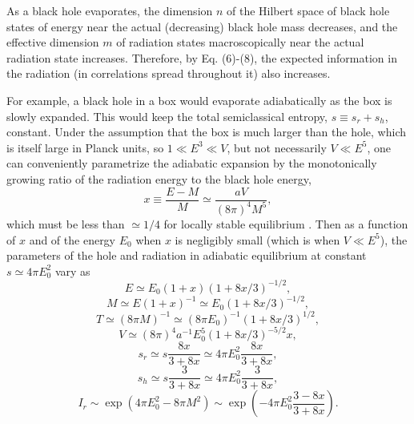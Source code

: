 \documentclass[12pt]{article}
\begin{document}
	As a black hole evaporates, the dimension $n$ of the Hilbert
space of black hole states of energy near the actual (decreasing)
black hole mass decreases, and the effective dimension $m$ of
radiation states macroscopically near the actual radiation state
increases.  Therefore, by Eq. (6)-(8), the expected information in
the radiation (in correlations spread throughout it) also increases.

	For example, a black hole in a box would evaporate
adiabatically as the box is slowly expanded.  This would keep the
total semiclassical entropy, $s \equiv s_r + s_h$, constant.
Under the assumption that the box is much larger than the hole,
which is itself large in Planck units, so $1 \ll E^3 \ll V$, but not
necessarily $V \ll E^5$, one can conveniently parametrize
the adiabatic expansion by the monotonically growing ratio of
the radiation energy to the black hole energy,
	\begin{equation}
	x \equiv \frac{E-M}{M} \simeq \frac{aV}{(8\pi)^4M^5},
	\end{equation}
which must be less than $\simeq 1/4$ for locally stable equilibrium
\cite{Haw76a}.  Then as a function of $x$ and of the energy
$E_0$ when $x$ is negligibly small (which is when $V \ll E^5$),
the parameters of the hole and radiation in
adiabatic equilibrium at constant $s \simeq 4\pi E_0^2$ vary as
	\begin{equation}
	E \simeq E_0(1+x)(1+8x/3)^{-1/2},
	\end{equation}
	\begin{equation}
	M \simeq E(1+x)^{-1} \simeq E_0(1+8x/3)^{-1/2},
	\end{equation}
	\begin{equation}
	T \simeq (8\pi M)^{-1} \simeq (8\pi E_0)^{-1}(1+8x/3)^{1/2},
	\end{equation}
	\begin{equation}
	V \simeq (8\pi)^4 a^{-1} E_0^5 (1+8x/3)^{-5/2} x,
	\end{equation}
	\begin{equation}
	s_r \simeq s\frac{8x}{3+8x} \simeq 4\pi E_0^2
\frac{8x}{3+8x},
	\end{equation}
	\begin{equation}
	s_h \simeq s\frac{3}{3+8x} \simeq 4\pi E_0^2 \frac{3}{3+8x},
	\end{equation}
	\begin{equation}
	I_r \sim \exp(4\pi E_0^2 - 8\pi M^2) \sim
	 \exp(-4\pi E_0^2\frac{3-8x}{3+8x}).
	\end{equation}
\end{document}
